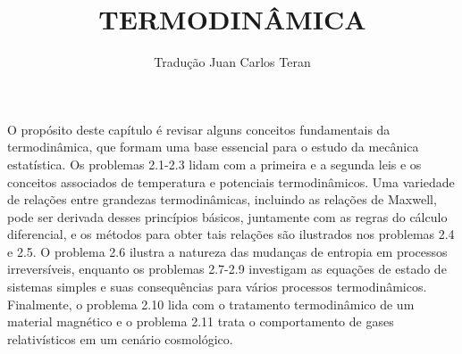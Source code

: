 \documentclass[12pt]{article}
\begin{document}
\medskip
\author{Tradução Juan Carlos Teran}
\title{TERMODINÂMICA}
\maketitle
O propósito deste capítulo é revisar alguns conceitos fundamentais da termodinâmica, que formam uma base essencial para o estudo da mecânica estatística. Os problemas 2.1-2.3 lidam com a primeira e a segunda leis e os conceitos associados de temperatura e potenciais termodinâmicos. Uma variedade de relações entre grandezas termodinâmicas, incluindo as relações de Maxwell, pode ser derivada desses princípios básicos, juntamente com as regras do cálculo diferencial, e os métodos para obter tais relações são ilustrados nos problemas 2.4 e 2.5. O problema 2.6 ilustra a natureza das mudanças de entropia em processos irreversíveis, enquanto os problemas 2.7-2.9 investigam as equações de estado de sistemas simples e suas consequências para vários processos termodinâmicos. Finalmente, o problema 2.10 lida com o tratamento termodinâmico de um material magnético e o problema 2.11 trata o comportamento de gases relativísticos em um cenário cosmológico.
\end{document}
